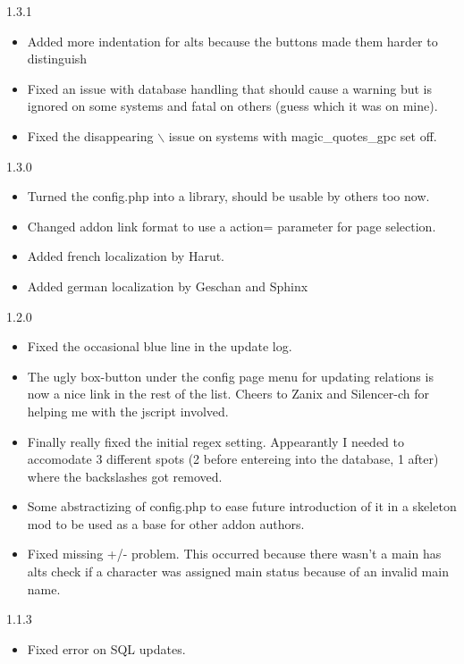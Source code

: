 \documentclass[12pt, a4paper]{article}
\begin{document}
\begin{description}
\item{1.3.1}
\begin{itemize}
\item Added more indentation for alts because the buttons made them harder to 
   distinguish
\item Fixed an issue with database handling that should cause a warning but is
   ignored on some systems and fatal on others (guess which it was on mine).
\item Fixed the disappearing $\backslash$ issue on systems with magic\_quotes\_gpc
   set off.
\end{itemize}

\item{1.3.0}
\begin{itemize}
\item Turned the config.php into a library, should be usable by others too now.
\item Changed addon link format to use a action= parameter for page selection.
\item Added french localization by Harut.
\item Added german localization by Geschan and Sphinx
\end{itemize}

\item{1.2.0}
\begin{itemize}
\item Fixed the occasional blue line in the update log.
\item The ugly box-button under the config page menu for updating relations is now
   a nice link in the rest of the list. Cheers to Zanix and Silencer-ch for
   helping me with the jscript involved.
\item Finally really fixed the initial regex setting. Appearantly I needed to
   accomodate 3 different spots (2 before entereing into the da\-ta\-base, 1 after)
   where the backslashes got removed.
\item Some abstractizing of config.php to ease future introduction of it in a
   skeleton mod to be used as a base for other addon authors.
\item Fixed missing +/- problem. This occurred because there wasn't a main has
   alts check if a character was assigned main status because of an invalid
   main name.
\end{itemize}

\item{1.1.3}
\begin{itemize}
\item Fixed error on SQL updates.
\end{itemize}


\end{description}
\end{document}
